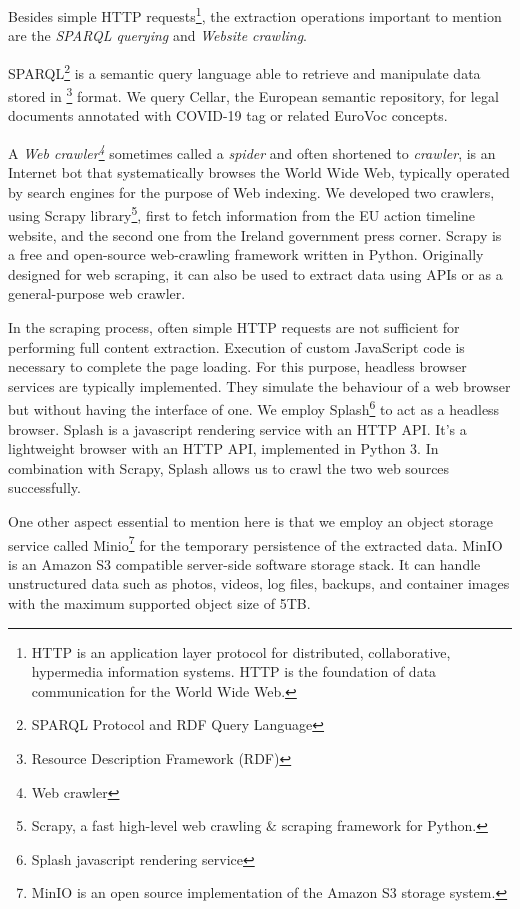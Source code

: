 Besides simple HTTP requests\footnote{ HTTP is an application layer protocol for distributed, collaborative, hypermedia information systems. HTTP is the foundation of data communication for the World Wide Web. }, the extraction operations important to mention are the \textit{SPARQL querying} and \textit{Website crawling}. 

SPARQL\footnote{ SPARQL Protocol and RDF Query Language } is a semantic query language able to retrieve and manipulate data stored in \footnote{ Resource Description Framework (RDF) } format. We query Cellar, the European semantic repository, for legal documents annotated with COVID-19 tag or related EuroVoc concepts. 

A \textit{Web crawler\footnote{ Web crawler }} sometimes called a \textit{spider} and often shortened to \textit{crawler}, is an Internet bot that systematically browses the World Wide Web, typically operated by search engines for the purpose of Web indexing. We developed two crawlers, using Scrapy library\footnote{ Scrapy, a fast high-level web crawling $\&$  scraping framework for Python. }, first to fetch information from the EU action timeline website, and the second one from the Ireland government press corner. Scrapy is a free and open-source web-crawling framework written in Python. Originally designed for web scraping, it can also be used to extract data using APIs or as a general-purpose web crawler.

In the scraping process, often simple HTTP requests are not sufficient for performing full content extraction. Execution of custom JavaScript code is necessary to complete the page loading. For this purpose, headless browser services are typically implemented. They simulate the behaviour of a web browser but without having the interface of one. We employ Splash\footnote{ Splash javascript rendering service } to act as a headless browser. Splash is a javascript rendering service with an HTTP API. It's a lightweight browser with an HTTP API, implemented in Python 3. In combination with Scrapy, Splash allows us to crawl the two web sources successfully. 

One other aspect essential to mention here is that we employ an object storage service called Minio\footnote{ MinIO is an open source implementation of the Amazon S3 storage system.  } for the temporary persistence of the extracted data. MinIO is an Amazon S3 compatible server-side software storage stack. It can handle unstructured data such as photos, videos, log files, backups, and container images with the maximum supported object size of 5TB.

